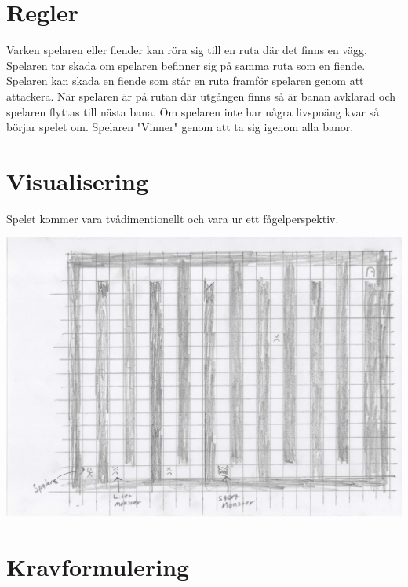 \documentclass{TDP005mall}
\begin{document}
\section{Regler}
Varken spelaren eller fiender kan röra sig till en ruta där det finns en vägg.
Spelaren tar skada om spelaren befinner sig på samma ruta som en fiende.
Spelaren kan skada en fiende som står en ruta framför spelaren genom att attackera.
När spelaren är på rutan där utgången finns så är banan avklarad och spelaren flyttas till nästa bana.
Om spelaren inte har några livspoäng kvar så börjar spelet om.
Spelaren "Vinner" genom att ta sig igenom alla banor.

\newpage
\section{Visualisering}
Spelet kommer vara tvådimentionellt och vara ur ett fågelperspektiv. 

\includegraphics[scale=0.5]{Spelskiss}

\newpage
\section{Kravformulering}
\end{document}
